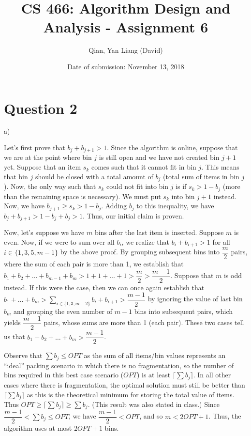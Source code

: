 \documentclass{article}
\title{CS 466: Algorithm Design and Analysis - Assignment 6}
\author{Qian, Yan Liang (David)}
\date{Date of submission: November 13, 2018}
\begin{document}
\newpage

\section{Question 2}

a)

Let's first prove that $b_j + b_{j+1} > 1$. Since the algorithm is online, suppose that we are at the point where bin
$j$ is still open and we have not created bin $j + 1$ yet. Suppose that an item $s_k$ comes such that it cannot fit in bin
$j$. This means that bin $j$ should be closed with a total amount of $b_j$ (total sum of items in bin $j$). Now, the
only way such that $s_k$ could not fit into bin $j$ is if $s_k > 1 - b_j$ (more than the remaining space is necessary).
We must put $s_k$ into bin $j + 1$ instead. Now, we have $b_{j + 1} \geq s_k > 1 - b_j$. Adding $b_j$ to this
inequality, we have $b_j + b_{j + 1} > 1 - b_j + b_j > 1$. Thus, our initial claim is proven.

Now, let's suppose we have $m$ bins after the last item is inserted. Suppose $m$ is even. Now, if we were to sum over
all $b_i$, we realize that $b_i + b_{i + 1} > 1$ for all $i \in \{1, 3, 5, m-1\}$ by the above proof. By grouping
subsequent bins into $\dfrac{m}{2}$ pairs, where the sum of each pair is more than 1, we establish that $b_1 + b_2 +
\ldots + b_{m-1} + b_{m} > 1 + 1 + \ldots + 1 > \dfrac{m}{2} > \dfrac{m-1}{2}$. Suppose that $m$ is odd instead. If this
were the case, then we can once again establish that $b_1 + \ldots + b_m > \sum_{i \in \{1, 3, m-2\}} b_i + b_{i + 1} >
\dfrac{m-1}{2}$ by ignoring the value of last bin $b_{m}$ and grouping the even number of $m-1$ bins into subsequent
pairs, which yields $\dfrac{m-1}{2}$ pairs, whose sums are more than 1 (each pair). These two cases tell us that $b_1 +
b_2 + \ldots + b_m > \dfrac{m-1}{2}$.

Observe that $\sum b_j \leq OPT$ as the sum of all items/bin values represents an ``ideal'' packing scenario in which
there is no fragmentation, so the number of bins required in this best case scenario ($OPT$) is at least $\lceil \sum
b_j \rceil$. In all other cases where there is fragmentation, the optimal solution must still be better than $\lceil
\sum b_j \rceil$ as this is the theoretical minimum for storing the total value of items. Thus $OPT \geq \lceil \sum b_j
\rceil \geq \sum b_j$. (This result was also stated in class.) Since $\dfrac{m-1}{2} < \sum b_j \leq OPT$, we have
$\dfrac{m-1}{2} < OPT$, and so $m < 2OPT + 1$. Thus, the algorithm uses at most $2OPT + 1$ bins.
\end{document}
